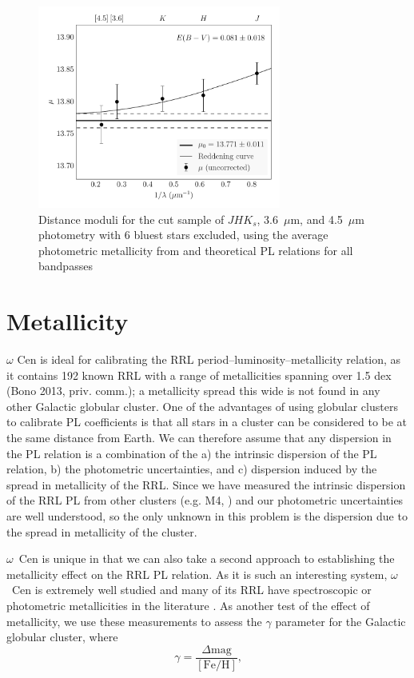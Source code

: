 \documentclass[a4paper,fleqn,usenatbib]{mnras}
\begin{document}
\begin{figure}
\begin{center}
\includegraphics[width=80mm]{final_plots/multiwavelength_distance_samestars_trimmed_m4.pdf}
\caption{Distance moduli for the cut sample of $J\!H\!K_s$, 3.6~$\mu$m, and 4.5~$\mu$m photometry with 6 bluest stars excluded, using the average photometric metallicity from \citet{2006ApJ...640L..43S} and theoretical PL relations for all bandpasses}
\label{fig:omegaCen_dist_trimmed_m4}
\end{center}
\end{figure}


\section{Metallicity}
\label{sec:metallicity}

$\omega$ Cen is ideal for calibrating the RRL period--luminosity--metallicity relation, as it contains 192 known RRL \citep{2004A&A...424.1101K} with a range of metallicities spanning over 1.5 dex (Bono 2013, priv. comm.); a metallicity spread this wide is not found in any other Galactic globular cluster. One of the advantages of using globular clusters to calibrate PL coefficients is that all stars in a cluster can be considered to be at the same distance from Earth. We can therefore assume that any dispersion in the PL relation is a combination of the a) the intrinsic dispersion of the PL relation, b) the photometric uncertainties, and c) dispersion induced by the spread in metallicity of the RRL. Since we have measured the intrinsic dispersion of the RRL PL from other clusters (e.g. M4, \citet{2015arXiv150507858N}) and our photometric uncertainties are well understood, so the only unknown in this problem is the dispersion due to the spread in metallicity of the cluster. 

 $\omega$~Cen is unique in that we can also take a second approach to establishing the metallicity effect on the RRL PL relation. As it is such an interesting system, $\omega$~Cen is extremely well studied and many of its RRL have spectroscopic or photometric metallicities in the literature \citep[e.g.][]{2006ApJ...640L..43S, 2000AJ....119.1824R}. As another test of the effect of metallicity, we use these measurements to assess the $\gamma$ parameter for the Galactic globular cluster, where 
\begin{equation} \label{eqn:gamma}
\gamma = \dfrac {\Delta \text{mag}} {[\text{Fe/H}]}\text{,}
\end{equation}
\end{document}
